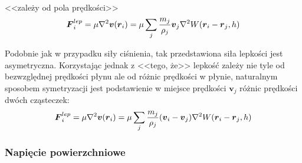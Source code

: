 \paragraph{}
<<zależy od pola prędkości>>
\begin{equation}
\boldsymbol{F}_i^{lep} = \mu \nabla^2 \boldsymbol{v}(\boldsymbol{r}_i) = \mu \sum\limits_{j} {m_j \over \rho_j} \boldsymbol{v}_j \nabla^2 W(\boldsymbol{r}_i-\boldsymbol{r}_j, h)
\label{eqn:sph_force_viscosity_1}
\end{equation}

Podobnie jak w przypadku siły ciśnienia, tak przedstawiona siła lepkości jest asymetryczna. Korzystając jednak z <<tego, że>> lepkość zależy nie tyle od bezwzględnej prędkości płynu ale od różnic prędkości w płynie, naturalnym sposobem symetryzacji jest podstawienie w miejsce prędkości $\boldsymbol{v}_j$ różnic prędkości dwóch cząsteczek:
\begin{equation}
\boldsymbol{F}_i^{lep} = \mu \nabla^2 \boldsymbol{v}(\boldsymbol{r}_i) = \mu \sum\limits_{j} {m_j \over \rho_j} (\boldsymbol{v}_i - \boldsymbol{v}_j) \nabla^2 W(\boldsymbol{r}_i-\boldsymbol{r}_j, h)
\label{eqn:sph_force_viscosity}
\end{equation}
\par

\subsubsection{Napięcie powierzchniowe}
\label{subsubsec:surface_tension}

